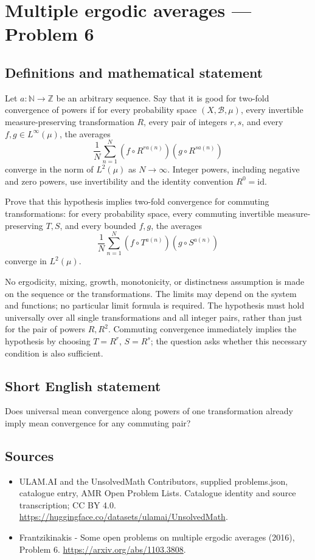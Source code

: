 \documentclass[11pt,a4paper]{article}
\begin{document}
\section*{Multiple ergodic averages — Problem 6}\label{statement}

\subsection{Definitions and mathematical statement}
Let $a:\mathbb N\to\mathbb Z$ be an arbitrary sequence.
Say that it is good for two-fold convergence of powers
if for every probability space $(X,\mathcal B,\mu)$, every
invertible measure-preserving transformation $R$, every pair
of integers $r,s$, and every $f,g\in L^\infty(\mu)$, the averages
\[
     \frac1N\sum_{n=1}^N
          (f\circ R^{r a(n)})(g\circ R^{s a(n)})
\]
converge in the norm of $L^2(\mu)$ as $N\to\infty$.
Integer powers, including negative and zero powers, use
invertibility and the identity convention $R^0=\mathrm{id}$.

Prove that this hypothesis implies two-fold convergence for
commuting transformations: for every probability space,
every commuting invertible measure-preserving $T,S$, and
every bounded $f,g$, the averages
\[
     \frac1N\sum_{n=1}^N
          (f\circ T^{a(n)})(g\circ S^{a(n)})
\]
converge in $L^2(\mu)$.

No ergodicity, mixing, growth, monotonicity, or distinctness
assumption is made on the sequence or the transformations.
The limits may depend on the system and functions; no
particular limit formula is required. The hypothesis must
hold universally over all single transformations and all
integer pairs, rather than just for the pair of powers
$R,R^2$. Commuting convergence immediately implies the
hypothesis by choosing $T=R^r$, $S=R^s$; the question
asks whether this necessary condition is also sufficient.
\subsection{Short English statement}
Does universal mean convergence along powers of one transformation already imply mean convergence for any commuting pair?
\subsection{Sources}
\begin{itemize}
\item[S1] ULAM.AI and the UnsolvedMath Contributors, supplied problems.json, catalogue entry, AMR Open Problem Lists. Catalogue identity and source transcription; CC BY 4.0.
\url{https://huggingface.co/datasets/ulamai/UnsolvedMath}.
\item[S2] Frantzikinakis - Some open problems on multiple ergodic averages (2016), Problem 6. 
\url{https://arxiv.org/abs/1103.3808}.
\end{itemize}
\end{document}
